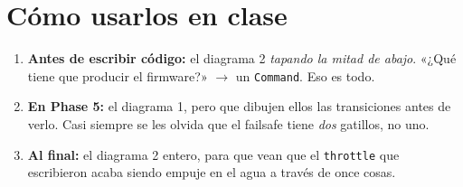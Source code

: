 \documentclass[11pt,a4paper]{article}
\begin{document}
\section*{Cómo usarlos en clase}
\begin{enumerate}[leftmargin=*,itemsep=3pt]
\item \textbf{Antes de escribir código:} el diagrama 2 \emph{tapando la mitad de abajo}.
«¿Qué tiene que producir el firmware?» $\rightarrow$ un \texttt{Command}. Eso es todo.
\item \textbf{En Phase 5:} el diagrama 1, pero que dibujen ellos las transiciones antes de
verlo. Casi siempre se les olvida que el failsafe tiene \emph{dos} gatillos, no uno.
\item \textbf{Al final:} el diagrama 2 entero, para que vean que el \texttt{throttle} que
escribieron acaba siendo empuje en el agua a través de once cosas.
\end{enumerate}
\end{document}

